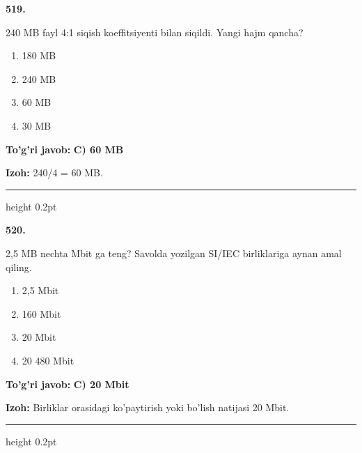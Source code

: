 \documentclass[10pt,a4paper,oneside]{article}
\begin{document}
\noindent\textbf{\color{ink}519.}
\par
240 MB fayl 4:1 siqish koeffitsiyenti bilan siqildi. Yangi hajm qancha?
\begin{enumerate}[label=\Alph*),leftmargin=9mm]
\item 180 MB
\item 240 MB
\item 60 MB
\item 30 MB
\end{enumerate}
\begin{tcolorbox}[enhanced,breakable,colback=teal!4,colframe=teal!50!black,boxrule=0.5pt,arc=1.1mm,left=3mm,right=3mm,top=1.7mm,bottom=1.7mm,before skip=2mm,after skip=2mm]
\textbf{\color{teal}To'g'ri javob:} \textbf{C) 60 MB}
\par\smallskip
\textbf{Izoh:} 240/4 = 60 MB.
\end{tcolorbox}
\vspace{2mm}\hrule height 0.2pt \vspace{3mm}

\noindent\textbf{\color{ink}520.}
\par
2,5 MB nechta Mbit ga teng? Savolda yozilgan SI/IEC birliklariga aynan amal qiling.
\begin{enumerate}[label=\Alph*),leftmargin=9mm]
\item 2,5 Mbit
\item 160 Mbit
\item 20 Mbit
\item 20 480 Mbit
\end{enumerate}
\begin{tcolorbox}[enhanced,breakable,colback=teal!4,colframe=teal!50!black,boxrule=0.5pt,arc=1.1mm,left=3mm,right=3mm,top=1.7mm,bottom=1.7mm,before skip=2mm,after skip=2mm]
\textbf{\color{teal}To'g'ri javob:} \textbf{C) 20 Mbit}
\par\smallskip
\textbf{Izoh:} Birliklar orasidagi ko'paytirish yoki bo'lish natijasi 20 Mbit.
\end{tcolorbox}
\vspace{2mm}\hrule height 0.2pt \vspace{3mm}
\end{document}
